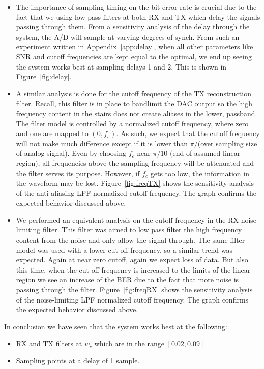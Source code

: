 \documentclass[]{article}
\begin{document}
\begin{itemize}
\item The importance of sampling timing on the bit error rate is crucial due to the fact that we using low pass filters at both RX and TX  which delay the signals passing through them. From a sensitivity analysis of the delay through the system, the A/D will sample at varying degrees of synch. From such an experiment written in Appendix~\ref{app:delay}, when all other parameters like SNR and cutoff frequencies are kept equal to the optimal, we end up seeing the system works best at sampling delays 1 and 2. This is shown in Figure~\ref{fig:delay}.
\item A similar analysis is done for the cutoff frequency of the TX reconstruction filter. Recall, this filter is in place to bandlimit the DAC output so the high frequency content in the stairs does not create aliases in the lower, passband. The filter model is controlled by a normalized cutoff frequency, where zero and one are mapped to $\left(0,f_s\right)$.  As such, we expect that the cutoff frequency will not make much difference except if it is lower than $\pi/$(over sampling size of analog signal).  Even by choosing $f_c$ near $\pi/10$ (end of assumed linear region), all frequencies above the sampling frequency will be attenuated and the filter serves its purpose.  However, if $f_c$ gets too low, the information in the waveform may be lost. 
Figure~\ref{fig:freqTX} shows the sensitivity analysis of the anti-aliasing LPF normalized cutoff frequency.  The graph confirms the expected behavior discussed above.
\item We performed an equivalent analysis on the cutoff frequency in the RX noise-limiting filter.  This filter was aimed to low pass filter the high frequency content from the noise and only allow the signal through.  The same filter model was used with a lower cut-off frequency, so a similar trend was expected. Again at near zero cutoff, again we expect loss of data. But also this time, when the cut-off frequency is increased to the limits of the linear region we see an increase of the BER due to the fact that more noise is passing through the filter. Figure~\ref{fig:freqRX} shows the sensitivity analysis of the noise-limiting LPF normalized cutoff frequency.  The graph confirms the expected behavior discussed above.
\end{itemize}

In conclusion we have seen that the system works best at the following:
\begin{itemize}
\item RX and TX filters  at $w_c$ which are in the range $\left[0.02,0.09\right]  $
\item Sampling points at a delay of 1 sample.
\end{itemize}
\end{document}
